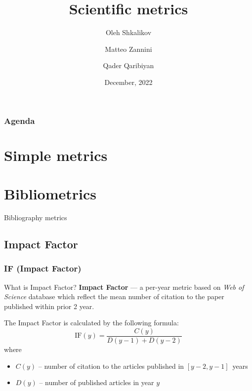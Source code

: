 \documentclass{beamer}
\title[Scientific metrics]{Scientific metrics}
\author[O. Shkalikov \and M. Zannini \and Q. Qaribiyan]
{Oleh Shkalikov \and Matteo Zannini \and Qader Qaribiyan}
\institute[]{TU Dresden, Computer Science Faculty}
\date{December, 2022}
\newcommand{\wos}{\textit{Web of Science} }
\begin{document}
\frame{\titlepage}

\begin{frame}
    \frametitle{Agenda}
    \tableofcontents
\end{frame}

\section{Simple metrics}

\section{Bibliometrics}

\begin{frame}
    \centering
    \Huge
    Bibliography metrics
\end{frame}

\subsection{Impact Factor}
\begin{frame}
    \frametitle{IF (Impact Factor)}
    \begin{block}{What is Impact Factor?}
        \textbf{Impact Factor}\cite{garfield1972citation} --- a per-year
        metric based on \wos database which reflect the mean number of citation
        to the paper published within prior 2 year.
    \end{block}

    The Impact Factor is calculated by the following formula:
    \[
        \text{IF}(y) = \frac{C(y)}{D(y - 1) + D(y - 2)}
    \]
    where
    \begin{itemize}
        \item $C(y)$ -- number of citation to the articles published in $[y-2, y-1]$~years
        \item $D(y)$ -- number of published articles in year $y$
    \end{itemize}
\end{frame}
\end{document}
